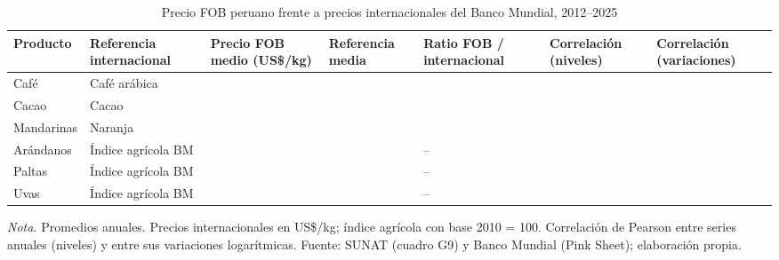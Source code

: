 \begin{table}[H]
\centering
\small
\caption{Precio FOB peruano frente a precios internacionales del Banco Mundial, 2012--2025}
\label{tab:tabla3_precios_internacionales}
\begin{tabularx}{\linewidth}{>{\raggedright\arraybackslash}X>{\raggedright\arraybackslash}X>{\raggedleft\arraybackslash}X>{\raggedleft\arraybackslash}X>{\raggedleft\arraybackslash}X>{\raggedleft\arraybackslash}X>{\raggedleft\arraybackslash}X}
\toprule
\textbf{Producto} & \textbf{Referencia internacional} & \textbf{Precio FOB medio (US\$/kg)} & \textbf{Referencia media} & \textbf{Ratio FOB / internacional} & \textbf{Correlación (niveles)} & \textbf{Correlación (variaciones)} \\
\midrule
Café & Café arábica & 3.82 & 4.28 & 0.90 & 0.99 & 0.98 \\
Cacao & Cacao & 3.50 & 3.30 & 1.07 & 1.00 & 0.97 \\
Mandarinas & Naranja & 1.16 & 0.98 & 1.35 & 0.30 & 0.47 \\
Arándanos & Índice agrícola BM & 7.87 & 100.7 & -- & -0.13 & -0.34 \\
Paltas & Índice agrícola BM & 1.88 & 100.7 & -- & -0.58 & -0.20 \\
Uvas & Índice agrícola BM & 2.47 & 100.7 & -- & 0.68 & 0.19 \\
\bottomrule
\end{tabularx}
\par\vspace{2pt}\parbox{\linewidth}{\footnotesize\textit{Nota.} Promedios anuales. Precios internacionales en US\$/kg; índice agrícola con base 2010 = 100. Correlación de Pearson entre series anuales (niveles) y entre sus variaciones logarítmicas. Fuente: SUNAT (cuadro G9) y Banco Mundial (Pink Sheet); elaboración propia.}
\end{table}
